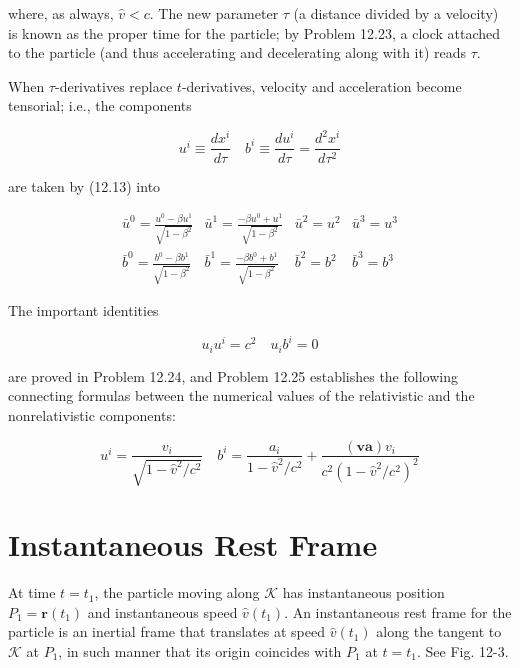 \documentclass[10pt]{article}
\begin{document}
where, as always, $\hat{v}<c$. The new parameter $\tau$ (a distance divided by a velocity) is known as the proper time for the particle; by Problem 12.23, a clock attached to the particle (and thus accelerating and decelerating along with it) reads $\tau$.

When $\tau$-derivatives replace $t$-derivatives, velocity and acceleration become tensorial; i.e., the components


\begin{equation*}
u^{i} \equiv \frac{d x^{i}}{d \tau} \quad b^{i} \equiv \frac{d u^{i}}{d \tau}=\frac{d^{2} x^{i}}{d \tau^{2}} \tag{12.22}
\end{equation*}


are taken by (12.13) into

\[
\begin{array}{llll}
\bar{u}^{0}=\frac{u^{0}-\beta u^{1}}{\sqrt{1-\beta^{2}}} & \bar{u}^{1}=\frac{-\beta u^{0}+u^{1}}{\sqrt{1-\beta^{2}}} & \bar{u}^{2}=u^{2} & \bar{u}^{3}=u^{3} \\
\bar{b}^{0}=\frac{b^{0}-\beta b^{1}}{\sqrt{1-\beta^{2}}} & \bar{b}^{1}=\frac{-\beta b^{0}+b^{1}}{\sqrt{1-\beta^{2}}} & \bar{b}^{2}=b^{2} & \bar{b}^{3}=b^{3} \tag{12.24}
\end{array}
\]

The important identities


\begin{equation*}
u_{i} u^{i}=c^{2} \quad u_{i} b^{i}=0 \tag{12.25}
\end{equation*}


are proved in Problem 12.24, and Problem 12.25 establishes the following connecting formulas between the numerical values of the relativistic and the nonrelativistic components:


\begin{equation*}
u^{i}=\frac{v_{i}}{\sqrt{1-\hat{v}^{2} / c^{2}}} \quad b^{i}=\frac{a_{i}}{1-\hat{v}^{2} / c^{2}}+\frac{(\mathbf{v a}) v_{i}}{c^{2}\left(1-\hat{v}^{2} / c^{2}\right)^{2}} \tag{12.26}
\end{equation*}


\section*{Instantaneous Rest Frame}
At time $t=t_{1}$, the particle moving along $\mathscr{K}$ has instantaneous position $P_{1}=\mathbf{r}\left(t_{1}\right)$ and instantaneous speed $\hat{v}\left(t_{1}\right)$. An instantaneous rest frame for the particle is an inertial frame that translates at speed $\hat{v}\left(t_{1}\right)$ along the tangent to $\mathscr{K}$ at $P_{1}$, in such manner that its origin coincides with $P_{1}$ at $t=t_{1}$. See Fig. 12-3.
\end{document}
